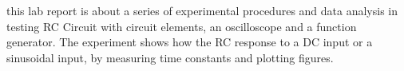this lab report is about a series of experimental procedures and data analysis in testing RC Circuit with circuit elements, an oscilloscope and a function generator. The experiment shows how the RC response to a DC input or a sinusoidal input, by measuring time constants and plotting figures. 